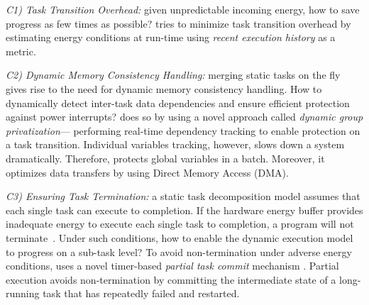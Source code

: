 \noindent{} \emph{C1) Task Transition Overhead:} given unpredictable incoming energy, how to save progress as few times as possible? \sys tries to minimize task transition overhead by estimating energy conditions at run-time using \emph{recent execution history} as a metric.

\noindent\emph{C2) Dynamic Memory Consistency Handling:} merging static tasks on the fly gives rise to the need for dynamic memory consistency handling. How to dynamically detect inter-task data dependencies and ensure efficient protection against power interrupts? \sys does so by using a novel
approach called \emph{dynamic group privatization}--- %
performing real-time dependency tracking to enable protection on a task transition. Individual variables tracking, however, slows down a system dramatically. Therefore, \sys protects global variables in a batch. Moreover, it optimizes data transfers by using Direct Memory Access (DMA).

\noindent\emph{C3) Ensuring Task Termination:} a static task decomposition model assumes that each
single task can execute to completion. If the hardware energy buffer provides
inadequate energy to execute each single task to completion, a program will not
terminate~\cite{cleancut_2018}. Under such conditions, how to enable the dynamic execution model to progress on a sub-task level? To avoid non-termination under adverse
energy conditions, \sys uses a novel timer-based {\em partial task commit} mechanism .
Partial execution avoids non-termination by committing the intermediate state of a long-running
task that has repeatedly failed and restarted.

